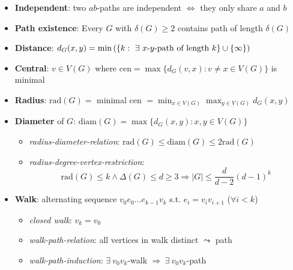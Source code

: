 \begin{itemize}
  \item \textbf{Independent}: two $ ab $-paths are independent $ \Leftrightarrow $ they only share $ a $ and $ b $
  \item \textbf{Path existence}: Every $ G $ with $ \delta(G) \geq 2 $ contains path of length $ \delta(G) $
  \item \textbf{Distance}: $ d_G(x,y) = \min\left( \{ k : \ \exists \text{ $ x $-$ y $-path of length } k \} \cup \{ \infty \} \right) $
  \item \textbf{Central}: $ v \in V(G) $ where $ \text{cen} = \max\{ d_G(v,x) : v \neq x \in V(G) \} $ is minimal
  \item \textbf{Radius}: $ \text{rad}(G) = $ minimal cen $ = \min_{x \in V(G)}\max_{y \in V(G)}d_G(x,y) $
  \item \textbf{Diameter} of $ G $: $ \text{diam}(G) = \max\{ d_G(x,y) : x,y \in V(G) \} $
  \begin{itemize}
    \item \emph{radius-diameter-relation}: $ \text{rad}(G) \leq \text{diam}(G) \leq 2\text{rad}(G) $
    \item \emph{radius-degree-vertex-restriction}:
    \begin{equation*}
      \text{rad}(G) \leq k \wedge \Delta(G) \leq d \geq 3 \Rightarrow \vert G \vert \leq \frac{d}{d-2}(d-1)^k
    \end{equation*}
  \end{itemize}
  \item \textbf{Walk}: alternating sequence $ v_0e_0\dots e_{k-1}v_k $ s.t. $ e_i = v_iv_{i+1} $ ($ \forall i < k $)
  \begin{itemize}
    \item \emph{closed walk}: $ v_k = v_0 $ 
    \item \emph{walk-path-relation}: all vertices in walk distinct $ \leadsto $ path
    \item \emph{walk-path-induction}: $ \exists \ v_0v_k $-walk $ \Rightarrow \ \exists \ v_0v_k $-path 
  \end{itemize}
\end{itemize}

